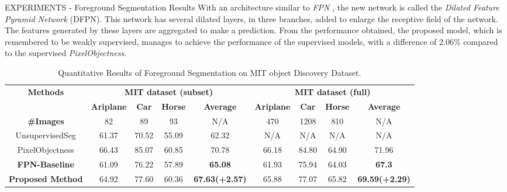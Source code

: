 \begin{frame}{EXPERIMENTS - Foreground Segmentation Results}
    With an architecture similar to \emph{FPN} , the new network is called the \emph{Dilated Feature Pyramid 
    Network} (DFPN). This network has several dilated layers, in three branches, 
    added to enlarge the receptive field of the network. The features generated 
    by these layers are aggregated to make a prediction. From the performance obtained, the proposed 
    model, which is remembered to be weakly supervised, manages to achieve the 
    performance of the supervised models, with a difference of 2.06\% compared 
    to the supervised \emph{PixelObjectness}.
    \begin{table}[h!]
        \centering
        \begin{adjustbox}{max width=\textwidth}
        \begin{tabular}{|c||c|c|c|c||c|c|c|c|}
            \hline
            \multirow{2}{*}{\bfseries{Methods}} & \multicolumn{4}{c||}{\bfseries{MIT dataset (subset)}} & \multicolumn{4}{c|}{\bfseries{MIT dataset (full)}} \\            & \bfseries{Ariplane} & \bfseries{Car} & \bfseries{Horse}  & \bfseries{Average} & \bfseries{Ariplane} & \bfseries{Car} & \bfseries{Horse}  & \bfseries{Average} \\
            \hline
            \bfseries{\#Images} & 82 & 89 & 93 & N/A & 470 & 1208 & 810 & N/A\\
            \hline
            UnsupervisedSeg \cite{0876055520} & 61.37 & 70.52 & 55.09 &62.32 & N/A & N/A & N/A & N/A\\
            \hline
            PixelObjectness \cite{0876055538} & 66.43 & 85.07 & 60.85 &70.78 & 66.18 & 84.80 & 64.90 & 71.96\\
            \hline 
            \bfseries{FPN-Baseline} & 61.09 & 76.22 & 57.89 & \bfseries{65.08} & 61.93 & 75.94 & 64.03 & \bfseries{67.3}\\
            \hline
            \bfseries{Proposed Method} & 64.92 & 77.60 & 60.36 & \bfseries{67.63(+2.57)} & 65.88 & 77.07 & 65.82 & \bfseries{69.59(+2.29)}\\
            \hline
        \end{tabular}
        \end{adjustbox}
        \caption{Quantitative Results of Foreground Segmentation on MIT object Discovery Dataset.}
    \end{table}
\end{frame}

